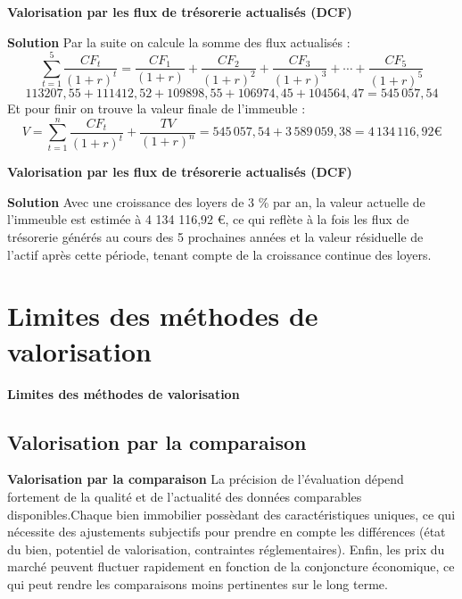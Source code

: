 \documentclass{beamer}
\begin{document}
\begin{frame}{\textbf{Valorisation par les flux de trésorerie actualisés (DCF)}}
	
	\begin{exampleblock}{\textbf{Solution}}
Par la suite on calcule la somme des flux actualisés : 
	\[ \sum_{t=1}^5 \frac{CF_t}{(1+r)^t}= \frac{CF_1}{(1+r)}+\frac{CF_2}{(1+r)^2}+\frac{CF_3}{(1+r)^3}+\cdots+\frac{CF_5}{(1+r)^5}\]
	\[113207,55+111412,52+109898,55+ 106974,45+104564,47=545\,057,54 \]
Et pour finir on trouve la valeur finale de l'immeuble :
\[ V = \sum_{t=1}^n \frac{CF_t}{(1+r)^t}+\frac{TV}{(1+r)^n} =545\,057,54+3\,589\,059,38=4\,134\,116,92€ \]
	\end{exampleblock}
	

\end{frame}

\begin{frame}{\textbf{Valorisation par les flux de trésorerie actualisés (DCF)}}
	
	\begin{exampleblock}{\textbf{Solution}}
Avec une croissance des loyers de 3 \% par an, la valeur actuelle de l'immeuble est estimée à 4 134 116,92 €, ce qui reflète à la fois les flux de trésorerie générés au cours des 5 prochaines années et la valeur résiduelle de l'actif après cette période, tenant compte de la croissance continue des loyers.
	\end{exampleblock}
	
	
\end{frame}

\section{Limites des méthodes de valorisation}
\begin{frame}{\textbf{Limites des méthodes de valorisation}}
\subsection{Valorisation par la comparaison}
\begin{block}{\textbf{Valorisation par la comparaison}}
La précision de l’évaluation dépend fortement de la qualité et de l’actualité des données comparables disponibles.Chaque bien immobilier possèdant des caractéristiques uniques, ce qui nécessite des ajustements subjectifs pour prendre en compte les différences (état du bien, potentiel de valorisation, contraintes réglementaires). Enfin, les prix du marché peuvent fluctuer rapidement en fonction de la conjoncture économique, ce qui peut rendre les comparaisons moins pertinentes sur le long terme.
\end{block}

\end{frame}
\end{document}
